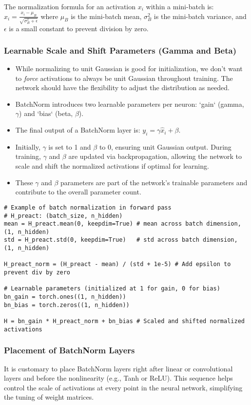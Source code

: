 The normalization formula for an activation $x_i$ within a mini-batch is:
$ \hat{x}_i = \frac{x_i - \mu_B}{\sqrt{\sigma_B^2 + \epsilon}} $
where $\mu_B$ is the mini-batch mean, $\sigma_B^2$ is the mini-batch variance, and $\epsilon$ is a small constant to prevent division by zero.

\subsubsection{Learnable Scale and Shift Parameters (Gamma and Beta)}
\begin{itemize}
    \item While normalizing to unit Gaussian is good for initialization, we don't want to \textit{force} activations to always be unit Gaussian throughout training. The network should have the flexibility to adjust the distribution as needed.
    \item BatchNorm introduces two learnable parameters per neuron: `gain` (gamma, $\gamma$) and `bias` (beta, $\beta$).
    \item The final output of a BatchNorm layer is: $y_i = \gamma \hat{x}_i + \beta$.
    \item Initially, $\gamma$ is set to 1 and $\beta$ to 0, ensuring unit Gaussian output. During training, $\gamma$ and $\beta$ are updated via backpropagation, allowing the network to scale and shift the normalized activations if optimal for learning.
    \item These $\gamma$ and $\beta$ parameters are part of the network's trainable parameters and contribute to the overall parameter count.
\end{itemize}

\begin{lstlisting}
# Example of batch normalization in forward pass
# H_preact: (batch_size, n_hidden)
mean = H_preact.mean(0, keepdim=True) # mean across batch dimension, (1, n_hidden)
std = H_preact.std(0, keepdim=True)   # std across batch dimension, (1, n_hidden)

H_preact_norm = (H_preact - mean) / (std + 1e-5) # Add epsilon to prevent div by zero

# Learnable parameters (initialized at 1 for gain, 0 for bias)
bn_gain = torch.ones((1, n_hidden))
bn_bias = torch.zeros((1, n_hidden))

H = bn_gain * H_preact_norm + bn_bias # Scaled and shifted normalized activations
\end{lstlisting}

\subsubsection{Placement of BatchNorm Layers}
It is customary to place BatchNorm layers right after linear or convolutional layers and before the nonlinearity (e.g., Tanh or ReLU). This sequence helps control the scale of activations at every point in the neural network, simplifying the tuning of weight matrices.

